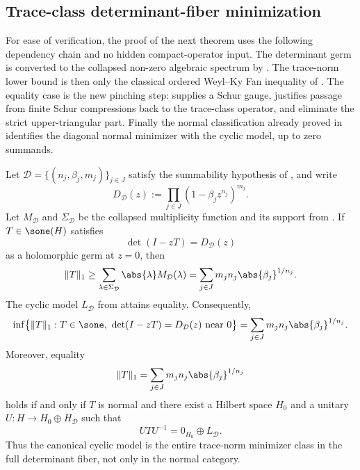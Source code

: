 \subsection{Trace-class determinant-fiber minimization}

For ease of verification, the proof of the next theorem uses the following
dependency chain and no hidden compact-operator input. The determinant germ is
converted to the collapsed non-zero algebraic spectrum by
.
The trace-norm lower bound is then only the classical ordered Weyl--Ky Fan
inequality of . The equality case is the new
pinching step:  supplies a Schur gauge,
 justifies passage from finite Schur
compressions back to the trace-class operator, and
eliminate the strict upper-triangular part. Finally the normal classification
already proved in  identifies the diagonal
normal minimizer with the cyclic model, up to zero summands.

\begin{theorem}
  \label{thm:determinant-fiber-trace-minimality}
  Let \(\mathcal D=\{(n_j,\beta_j,m_j)\}_{j\in J}\) satisfy the
  summability hypothesis of , and
  write
  \[
    D_{\mathcal D}(z)
    :=\prod_{j\in J}(1-\beta_j z^{n_j})^{m_j}.
  \]
  Let \(M_{\mathcal D}\) and \(\Sigma_{\mathcal D}\) be the collapsed
  multiplicity function and its support from
  . If \(T\in \sone(H)\)
  satisfies
  \[
    \det(I-zT)=D_{\mathcal D}(z)
  \]
  as a holomorphic germ at \(z=0\), then
  \[
    \|T\|_1
    \ge \sum_{\lambda\in\Sigma_{\mathcal D}}
      \abs{\lambda}M_{\mathcal D}(\lambda)
    =\sum_{j\in J}m_j n_j\abs{\beta_j}^{1/n_j}.
  \]
  The cyclic model \(L_{\mathcal D}\) from
   attains equality. Consequently,
  \[
    \inf\bigl\{\|T\|_1:T\in \sone,\ \det(I-zT)=D_{\mathcal D}(z)
      \text{ near }0\bigr\}
    =\sum_{j\in J}m_j n_j\abs{\beta_j}^{1/n_j}.
  \]
  Moreover, equality
  \[
    \|T\|_1
    =\sum_{j\in J}m_j n_j\abs{\beta_j}^{1/n_j}
  \]
  holds if and only if \(T\) is normal and there exist a Hilbert space
  \(H_0\) and a unitary \(U:H\to H_0\oplus H_{\mathcal D}\) such that
  \[
    UTU^{-1}=0_{H_0}\oplus L_{\mathcal D}.
  \]
  Thus the canonical cyclic model is the entire trace-norm minimizer class
  in the full determinant fiber, not only in the normal category.
\end{theorem}


